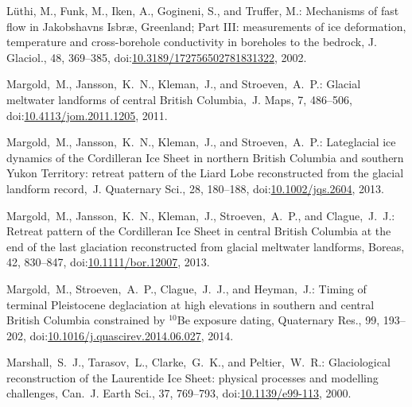 \documentclass[tc, manuscript]{copernicus}
\begin{document}
\begin{thebibliography}{114}
L{\"u}thi, M., Funk, M., Iken, A., Gogineni, S., and Truffer, M.: Mechanisms of fast flow in {J}akobshavns {I}sbr{\ae}, {G}reenland; {P}art {III}: measurements of ice deformation, temperature and cross-borehole conductivity in boreholes to the bedrock, J. Glaciol., 48, 369--385,
doi:\href{http://dx.doi.org/10.3189/172756502781831322}{10.3189/172756502781831322}, 2002.


Margold,~M., Jansson,~K.~N., Kleman,~J., and Stroeven,~A.~P.: Glacial meltwater landforms of central British Columbia,~J. Maps, 7, 486--506,
doi:\href{http://dx.doi.org/10.4113/jom.2011.1205}{10.4113/jom.2011.1205}, 2011.


Margold,~M., Jansson,~K.~N., Kleman,~J., and Stroeven,~A.~P.: Lateglacial ice dynamics of the Cordilleran Ice Sheet in northern British Columbia and southern Yukon Territory: retreat pattern of the Liard Lobe reconstructed from the glacial landform record,~J. Quaternary Sci., 28, 180--188,
doi:\href{http://dx.doi.org/10.1002/jqs.2604}{10.1002/jqs.2604}, 2013{}.


Margold,~M., Jansson,~K.~N., Kleman,~J., Stroeven,~A.~P., and Clague,~J.~J.: Retreat pattern of the Cordilleran Ice Sheet in central British Columbia at the end of the last glaciation reconstructed from glacial meltwater landforms, Boreas, 42, 830--847,
doi:\href{http://dx.doi.org/10.1111/bor.12007}{10.1111/bor.12007}, 2013{}.


Margold,~M., Stroeven,~A.~P., Clague,~J.~J., and Heyman,~J.: Timing of terminal Pleistocene deglaciation at high elevations in southern and central British Columbia constrained by $^{10}$Be exposure dating, Quaternary Res., 99, 193--202,
doi:\href{http://dx.doi.org/10.1016/j.quascirev.2014.06.027}{10.1016/j.quascirev.2014.06.027}, 2014.


Marshall,~S.~J., Tarasov,~L., Clarke,~G.~K., and Peltier,~W.~R.: Glaciological reconstruction of the Laurentide Ice Sheet: physical processes and modelling challenges, Can.~J. Earth Sci., 37, 769--793,
doi:\href{http://dx.doi.org/10.1139/e99-113}{10.1139/e99-113}, 2000.



\end{thebibliography}
\end{document}
